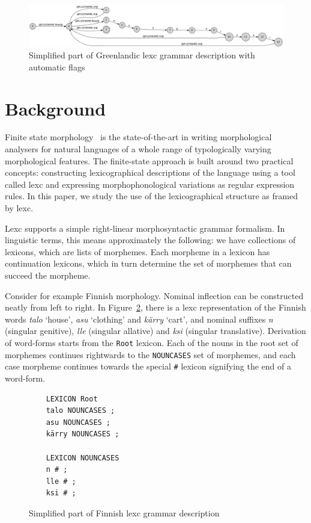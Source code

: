 \documentclass[10pt, a4paper]{article}
\begin{document}
\begin{figure}
    \includegraphics[width=\textwidth]{gr.png}
     \caption{Simplified part of Greenlandic lexc grammar description with automatic flags
     \label{fig:lexc-gr-flag}}
\end{figure}

\section{Background}

\label{sec:background}

Finite state morphology~\cite{beesley2003finite} is the
state-of-the-art in writing morphological analysers for natural
languages of a whole range of typologically varying morphological
features. The finite-state approach is built around two practical
concepts: constructing lexicographical descriptions of the language
using a tool called lexc and expressing morphophonological
variations as regular expression rules. In this paper, we study the use
of the lexicographical structure as framed by lexc. 

Lexc supports a simple right-linear morphosyntactic grammar formalism. In
linguistic terms, this means approximately the following: we have
collections of lexicons, which are lists of morphemes. Each morpheme
in a lexicon has continuation lexicons, which in turn determine
the set of morphemes that can succeed the morpheme.

Consider for example Finnish morphology. Nominal inflection can be
constructed neatly from left to right. In Figure~\ref{fig:lexc-fin},
there is a lexc representation of the Finnish words \emph{talo} `house',
\emph{asu} `clothing' and \emph{kärry} `cart', and nominal suffixes
\emph{n} (singular genitive), \emph{lle} (singular allative) and
\emph{ksi} (singular translative). Derivation of word-forms starts
from the \texttt{Root} lexicon. Each of the nouns in the root set of morphemes
continues rightwards to the \texttt{NOUNCASES} set of morphemes, and each
case morpheme continues towards the special \texttt{\#} lexicon
signifying the end of a word-form.




\begin{figure}
    \centering
    \begin{verbatim}
    LEXICON Root
    talo NOUNCASES ;
    asu NOUNCASES ;
    kärry NOUNCASES ;

    LEXICON NOUNCASES
    n # ;
    lle # ;
    ksi # ;
    \end{verbatim}
    \caption{Simplified part of Finnish lexc grammar description
    \label{fig:lexc-fin}}
\end{figure}
\end{document}
